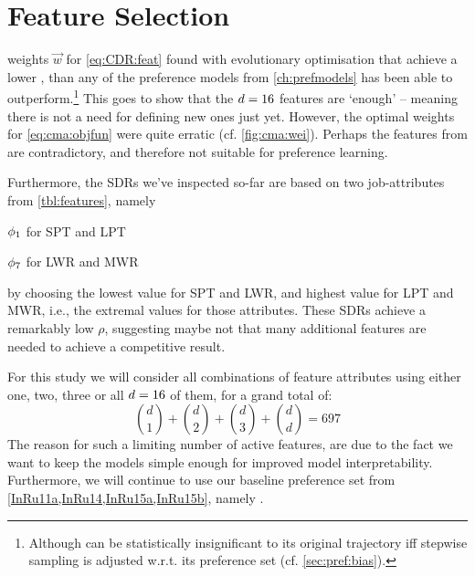 
\chapter{Feature Selection}\label{ch:featselect}

 weights $\vec{w}$ 
for \cref{eq:CDR:feat} found with evolutionary optimisation that achieve a 
lower \namerho, than any of the preference models from \cref{ch:prefmodels}
has been able to outperform.\footnote{Although  can be 
  statistically insignificant to its original trajectory iff stepwise 
  sampling is adjusted w.r.t. its preference set (cf. \cref{sec:pref:bias}).} 
This goes to show that the $d=16$ features are `enough' -- 
meaning there is not a need for defining new ones just yet. 
However, the optimal weights for \cref{eq:cma:objfun} were quite erratic (cf. 
\cref{fig:cma:wei}). 
Perhaps the features from \PhiSet{\CMAES} are contradictory, and therefore not 
suitable for preference learning. 

Furthermore, the SDRs we've inspected so-far are based on two job-attributes 
from \cref{tbl:features}, namely
\begin{enumerate*}[after={{,}}]
  \item $\phi_1$ for SPT and LPT 
  \item $\phi_7$ for LWR and MWR 
\end{enumerate*}
by choosing the lowest value for SPT and LWR, and highest value for LPT and 
MWR, i.e., the extremal values for those attributes. 
These SDRs achieve a remarkably low $\rho$, suggesting maybe not that many 
additional features are needed to achieve a competitive result.

For this study we will consider all combinations of feature attributes using 
either one, two, three or all $d=16$ of them, for a grand total of:
\begin{equation}\label{eq:697}
{d \choose 1}+{d \choose 2}+{d \choose 3}+{d \choose d} = 697
\end{equation}
The reason for such a limiting number of active features, are due to the fact 
we want to keep the models simple enough for improved model interpretability.
Furthermore, we will continue to use our baseline preference set from 
\cref{InRu11a,InRu14,InRu15a,InRu15b}, namely .

